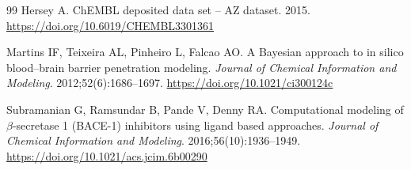 \begin{thebibliography}{99}
Hersey A. ChEMBL deposited data set -- AZ dataset. 2015. \url{https://doi.org/10.6019/CHEMBL3301361}

Martins IF, Teixeira AL, Pinheiro L, Falcao AO. A Bayesian approach to in silico blood--brain barrier penetration modeling. \emph{Journal of Chemical Information and Modeling}. 2012;52(6):1686--1697. \url{https://doi.org/10.1021/ci300124c}

Subramanian G, Ramsundar B, Pande V, Denny RA. Computational modeling of $\beta$-secretase 1 (BACE-1) inhibitors using ligand based approaches. \emph{Journal of Chemical Information and Modeling}. 2016;56(10):1936--1949. \url{https://doi.org/10.1021/acs.jcim.6b00290}
\end{thebibliography}
